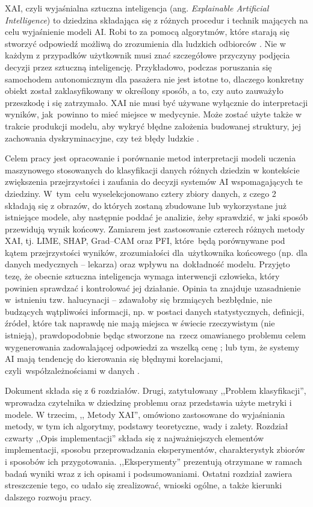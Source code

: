 XAI, czyli wyjaśnialna sztuczna inteligencja (ang. \textit{Explainable Artificial Intelligence}) to dziedzina składająca się z różnych procedur i technik mających na celu wyjaśnienie modeli AI. Robi to za pomocą algorytmów, które starają się stworzyć odpowiedź możliwą do zrozumienia dla ludzkich odbiorców \cite{gfg_xai_definition}. Nie w każdym z przypadków użytkownik musi znać szczegółowe przyczyny podjęcia decyzji przez sztuczną inteligencję. Przykładowo, podczas poruszania się samochodem autonomicznym dla pasażera nie jest istotne to, dlaczego konkretny obiekt został zaklasyfikowany w określony sposób, a to, czy auto zauważyło przeszkodę i się zatrzymało. XAI nie musi być używane wyłącznie do interpretacji wyników, jak~powinno to mieć miejsce w medycynie. Może zostać użyte także w trakcie produkcji modelu, aby wykryć błędne założenia budowanej struktury, jej zachowania dyskryminacyjne, czy też błędy ludzkie \cite{molnar2025}. 

Celem pracy jest opracowanie i porównanie metod interpretacji modeli uczenia maszynowego stosowanych do klasyfikacji danych różnych dziedzin w kontekście zwiększenia przejrzystości i zaufania do decyzji systemów AI wspomagających te dziedziny. W~tym~celu wyselekcjonowano cztery zbiory danych, z czego 2 składają się z obrazów, do których zostaną zbudowane lub wykorzystane już istniejące modele, aby następnie poddać je analizie, żeby sprawdzić, w jaki sposób przewidują wynik końcowy. Zamiarem jest zastosowanie czterech różnych metody XAI, tj. LIME, SHAP, Grad–CAM oraz PFI, które~będą porównywane pod kątem przejrzystości wyników, zrozumiałości dla~użytkownika końcowego (np. dla danych medycznych – lekarza) oraz wpływu na~dokładność modelu. Przyjęto tezę, że obecnie sztuczna inteligencja wymaga interwencji człowieka, który powinien sprawdzać i kontrolować jej działanie. Opinia ta znajduje uzasadnienie w~istnieniu tzw. halucynacji – zdawałoby się brzmiących bezbłędnie, nie budzących wątpliwości informacji, np. w postaci danych statystycznych, definicji, źródeł, które tak naprawdę nie mają miejsca w świecie rzeczywistym (nie istnieją), prawdopodobnie będąc stworzone na~rzecz omawianego problemu celem wygenerowania zadowalającej odpowiedzi za wszelką cenę \cite{halucination_definition}; lub tym, że systemy AI mają tendencję do kierowania się błędnymi korelacjami, czyli~współzależnościami w danych \cite{corellation_definition}.

Dokument składa się z 6 rozdziałów. Drugi, zatytułowany ,,Problem klasyfikacji'', wprowadza czytelnika w dziedzinę problemu oraz przedstawia użyte metryki i modele. W trzecim, ,, Metody XAI'', omówiono zastosowane do wyjaśniania metody, w tym ich algorytmy, podstawy teoretyczne, wady i zalety. Rozdział czwarty ,,Opis implementacji'' składa się z najważniejszych elementów implementacji, sposobu przeprowadzania eksperymentów, charakterystyk zbiorów i sposobów ich przygotowania. ,,Eksperymenty'' prezentują otrzymane w ramach badań wyniki wraz z ich opisami i podsumowaniami. Ostatni rozdział zawiera streszczenie tego, co udało się zrealizować, wnioski ogólne, a także kierunki dalszego rozwoju pracy.
